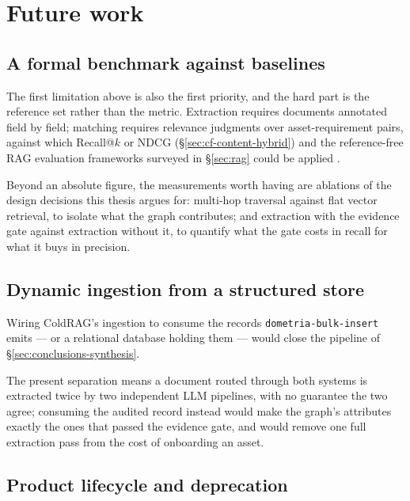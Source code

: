 \section{Future work}
\label{sec:conclusions-future-work}

\subsection{A formal benchmark against baselines}

The first limitation above is also the first priority, and the hard part is the reference set rather than the metric. Extraction requires documents annotated field by field; matching requires relevance judgments over asset-requirement pairs, against which Recall@$k$ or NDCG (\S\ref{sec:cf-content-hybrid}) and the reference-free RAG evaluation frameworks surveyed in \S\ref{sec:rag} could be applied \citep{es2024ragas,chen2024benchmarking}. 

\vspace{0.3cm}

Beyond an absolute figure, the measurements worth having are ablations of the design decisions this thesis argues for: multi-hop traversal against flat vector retrieval, to isolate what the graph contributes; and extraction with the evidence gate against extraction without it, to quantify what the gate costs in recall for what it buys in precision.

\subsection{Dynamic ingestion from a structured store}

Wiring ColdRAG's ingestion to consume the records \texttt{dometria-bulk-insert} emits — or a relational database holding them — would close the pipeline of \S\ref{sec:conclusions-synthesis}. 

\vspace{0.3cm}

The present separation means a document routed through both systems is extracted twice by two independent LLM pipelines, with no guarantee the two agree; consuming the audited record instead would make the graph's attributes exactly the ones that passed the evidence gate, and would remove one full extraction pass from the cost of onboarding an asset.

\subsection{Product lifecycle and deprecation}

